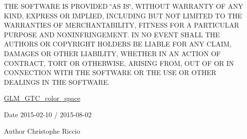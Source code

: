 T\-H\-E S\-O\-F\-T\-W\-A\-R\-E I\-S P\-R\-O\-V\-I\-D\-E\-D \char`\"{}\-A\-S I\-S\char`\"{}, W\-I\-T\-H\-O\-U\-T W\-A\-R\-R\-A\-N\-T\-Y O\-F A\-N\-Y K\-I\-N\-D, E\-X\-P\-R\-E\-S\-S O\-R I\-M\-P\-L\-I\-E\-D, I\-N\-C\-L\-U\-D\-I\-N\-G B\-U\-T N\-O\-T L\-I\-M\-I\-T\-E\-D T\-O T\-H\-E W\-A\-R\-R\-A\-N\-T\-I\-E\-S O\-F M\-E\-R\-C\-H\-A\-N\-T\-A\-B\-I\-L\-I\-T\-Y, F\-I\-T\-N\-E\-S\-S F\-O\-R A P\-A\-R\-T\-I\-C\-U\-L\-A\-R P\-U\-R\-P\-O\-S\-E A\-N\-D N\-O\-N\-I\-N\-F\-R\-I\-N\-G\-E\-M\-E\-N\-T. I\-N N\-O E\-V\-E\-N\-T S\-H\-A\-L\-L T\-H\-E A\-U\-T\-H\-O\-R\-S O\-R C\-O\-P\-Y\-R\-I\-G\-H\-T H\-O\-L\-D\-E\-R\-S B\-E L\-I\-A\-B\-L\-E F\-O\-R A\-N\-Y C\-L\-A\-I\-M, D\-A\-M\-A\-G\-E\-S O\-R O\-T\-H\-E\-R L\-I\-A\-B\-I\-L\-I\-T\-Y, W\-H\-E\-T\-H\-E\-R I\-N A\-N A\-C\-T\-I\-O\-N O\-F C\-O\-N\-T\-R\-A\-C\-T, T\-O\-R\-T O\-R O\-T\-H\-E\-R\-W\-I\-S\-E, A\-R\-I\-S\-I\-N\-G F\-R\-O\-M, O\-U\-T O\-F O\-R I\-N C\-O\-N\-N\-E\-C\-T\-I\-O\-N W\-I\-T\-H T\-H\-E S\-O\-F\-T\-W\-A\-R\-E O\-R T\-H\-E U\-S\-E O\-R O\-T\-H\-E\-R D\-E\-A\-L\-I\-N\-G\-S I\-N T\-H\-E S\-O\-F\-T\-W\-A\-R\-E.

\hyperlink{group__gtc__color__space}{G\-L\-M\-\_\-\-G\-T\-C\-\_\-color\-\_\-space}

\begin{DoxyDate}{Date}
2015-\/02-\/10 / 2015-\/08-\/02 
\end{DoxyDate}
\begin{DoxyAuthor}{Author}
Christophe Riccio 
\end{DoxyAuthor}
